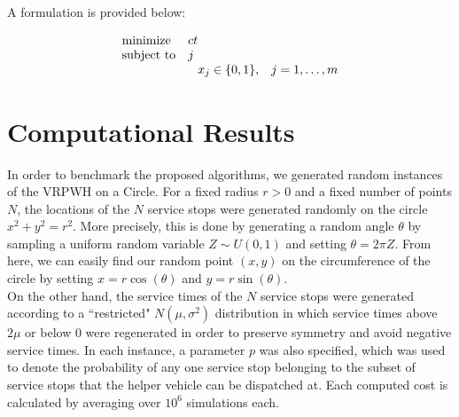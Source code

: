 \documentclass[12pt]{scrartcl}
\begin{document}
A formulation is provided below:

\begin{equation*}
\begin{array}{ll@{}ll}
\text{minimize}  & ct &\\
\text{subject to}&  j\\ &                                                & x_{j} \in \{0,1\}, &j=1 ,\dots, m
\end{array}
\end{equation*}
\fi


\section{Computational Results}
In order to benchmark the proposed algorithms, we generated random instances of the VRPWH on a Circle. For a fixed radius $r > 0$ and a fixed number of points $N$, the locations of the $N$ service stops were generated randomly on the circle $x^2 + y^2 = r^2$. More precisely, this is done by generating a random angle $\theta$ by sampling a uniform random variable $Z \sim U(0, 1)$ and setting $\theta = 2\pi Z$. From here, we can easily find our random point $(x, y)$ on the circumference of the circle by setting $x = r\cos(\theta)$ and $y = r\sin(\theta)$. \\

On the other hand, the service times of the $N$ service stops were generated according to a ``restricted" $N(\mu, \sigma^2)$ distribution in which service times above $2\mu$ or below $0$ were regenerated in order to preserve symmetry and avoid negative service times. In each instance, a parameter $p$ was also specified, which was used to denote the probability of any one service stop belonging to the subset of service stops that the helper vehicle can be dispatched at. Each computed cost is calculated by averaging over $10^{6}$ simulations each. \\
\end{document}
